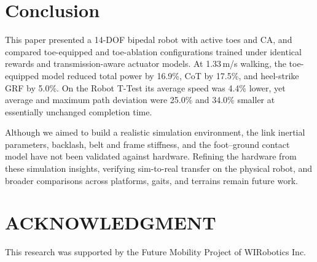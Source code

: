 \documentclass[10pt,twocolumn]{ICCAS}
\begin{document}
\section{Conclusion}

This paper presented a 14-DOF bipedal robot with active toes and CA, and compared toe-equipped and
toe-ablation configurations trained under identical rewards and transmission-aware actuator models.
At 1.33\,m/s walking, the toe-equipped model reduced total power by 16.9\%, CoT by 17.5\%, and
heel-strike GRF by 5.0\%. On the Robot T-Test its average speed was 4.4\% lower, yet average and maximum
path deviation were 25.0\% and 34.0\% smaller at essentially unchanged completion time.

Although we aimed to build a realistic simulation environment, the link inertial parameters, backlash,
belt and frame stiffness, and the foot--ground contact model have not been validated against
hardware. Refining the hardware from these simulation insights, verifying sim-to-real transfer on the
physical robot, and broader comparisons across platforms, gaits, and terrains remain future work.

\section*{ACKNOWLEDGMENT}
This research was supported by the Future Mobility Project of WIRobotics Inc.
\end{document}
